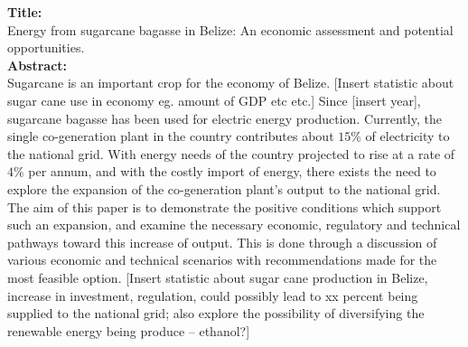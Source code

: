 \documentclass[12pt]{article}
\begin{document}
\noindent
\textbf{Title:} \\
Energy from sugarcane bagasse in Belize: An economic assessment and potential opportunities. \\

\noindent\textbf{Abstract:}\\
Sugarcane is an important crop for the economy of Belize. [Insert statistic about sugar cane use in economy eg. amount of GDP etc etc.] Since [insert year], sugarcane bagasse has been used for electric energy production. Currently, the single co-generation plant in the country contributes about $15\%$ of electricity to the national grid. With energy needs of the country projected to rise at a rate of $4\%$ per annum, and with the costly import of energy, there exists the need to explore the expansion of the co-generation plant's output to the national grid. The aim of this paper is to demonstrate the positive conditions which support such an expansion, and examine the necessary economic, regulatory and technical pathways toward this increase of output. This is done through a discussion of various economic and technical scenarios with recommendations made for the most feasible option. [Insert statistic about sugar cane production in Belize, increase in investment, regulation, could possibly lead to xx percent being supplied to the national grid; also explore the possibility of diversifying the renewable energy being produce -- ethanol?]
\end{document}
